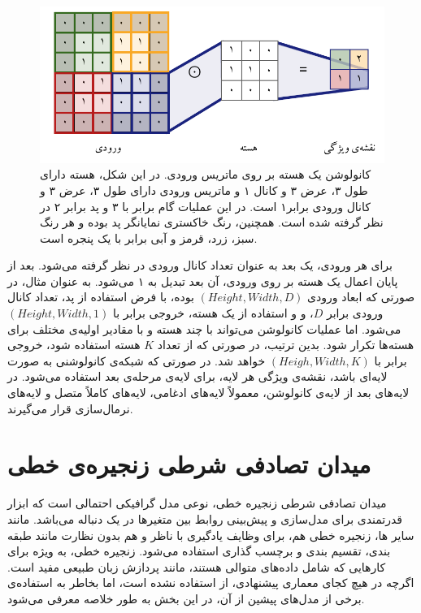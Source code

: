 \begin{figure}[!htb]
	\centering
	\includegraphics[scale=1]{Figures/cnn.pdf}
	\caption[کانولوشن یک هسته بر روی ماتریس ورودی]{
کانولوشن یک هسته بر روی ماتریس ورودی. در این شکل، هسته دارای طول ۳، عرض ۳ و کانال ۱ و ماتریس ورودی دارای طول ۳، عرض ۳ و کانال ورودی برابر۱ است. در این عملیات گام برابر با ۳ و پد برابر ۲ در نظر گرفته شده است. همچنین، رنگ خاکستری نمایانگر پد بوده و هر رنگ سبز، زرد، قرمز و آبی برابر با یک پنجره است.}
	\label{Fig:CNN}
\end{figure}

برای هر ورودی، یک بعد به عنوان تعداد کانال ورودی در نظر گرفته می‌شود. بعد از پایان اعمال یک هسته بر روی ورودی، آن بعد تبدیل به ۱ می‌شود. به عنوان مثال، در صورتی که ابعاد ورودی $(Height,Width,D)$ بوده، با فرض استفاده از پد، تعداد کانال ورودی برابر $D$، و و استفاده از یک هسته، خروجی برابر با $(Height,Width,1)$ می‌شود. اما عملیات کانولوشن می‌تواند با چند هسته و با مقادیر اولیه‌ی مختلف برای هسته‌ها تکرار شود. بدین ترتیب، در صورتی که از تعداد $K$ هسته استفاده شود، خروجی برابر با $(Heigh,Width,K)$ خواهد شد.
  در صورتی که شبکه‌ی کانولوشنی به صورت لایه‌ای باشد، نقشه‌ی ویژگی هر لایه، برای لایه‌ی مرحله‌ی بعد استفاده می‌شود. در لایه‌های بعد از لایه‌ی کانولوشن، معمولاً لایه‌های ادغامی، لایه‌های کاملاً متصل و لایه‌های نرمال‌سازی قرار می‌گیرند.
 \section{میدان تصادفی شرطی زنجیره‌ی خطی}
 میدان تصادفی شرطی  زنجیره خطی، نوعی مدل گرافیکی احتمالی است که ابزار قدرتمندی برای مدل‌سازی و پیش‌بینی روابط بین متغیرها در یک دنباله می‌باشد. مانند سایر ها،  زنجیره خطی هم، برای وظایف یادگیری با ناظر و هم بدون نظارت مانند طبقه بندی، تقسیم بندی و برچسب گذاری استفاده می‌شود.  زنجیره خطی، به ویژه برای کارهایی که شامل داده‌های متوالی هستند، مانند پردازش زبان طبیعی مفید است. اگرچه در هیچ کجای معماری پیشنهادی، از   استفاده نشده است، اما بخاطر به استفاده‌ی برخی از مدل‌های پیشین از آن، در این بخش به طور خلاصه معرفی می‌شود.
 
